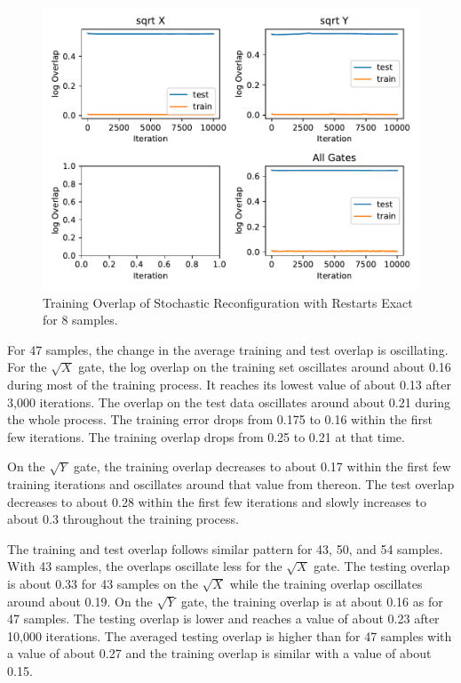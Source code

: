 \begin{figure}[H]
  \centering
  \includegraphics[width=\textwidth]{figures/results/SR-restarts-not-learned/avgOverlap_8.pdf}
  \caption[Training Overlap of Stochastic Reconfiguration with Restarts Exact]{Training 
  Overlap of Stochastic Reconfiguration with Restarts Exact for 8 samples.}
  \label{fig:sr_exact_overlap_8}
\end{figure}

For 47 samples, the change in the average training and test overlap is oscillating. For the 
$\sqrt{X}$ gate, the log overlap on the training set oscillates around about 0.16 during most 
of the training process. It 
reaches its lowest value of about 0.13 after 3,000 iterations. The overlap on the test data 
oscillates around about 0.21 during the whole process. The training error drops from 
0.175 to 0.16 within the first few iterations. The training overlap drops from 0.25 to 0.21 at that time.

On the $\sqrt{Y}$ gate, the training overlap decreases to about 0.17 within the first few training iterations 
and oscillates around that value from thereon. The test overlap decreases to about 0.28 within the first few
iterations and slowly increases to about 0.3 throughout the training process.

The training and test overlap follows similar pattern for 43, 50, and 54 samples.
With 43 samples, the overlaps oscillate less for the $\sqrt{X}$ gate. The testing overlap is about 
0.33 for 43 samples on the $\sqrt{X}$ while the training overlap oscillates around about 0.19.
On the $\sqrt{Y}$ gate, the training overlap is at about 0.16 as for 47 samples. The testing overlap is 
lower and reaches a value of about 0.23 after 10,000 iterations. The averaged testing overlap is higher than 
for 47 samples with a value of about 0.27 and the training overlap is similar with a value of about 0.15.

